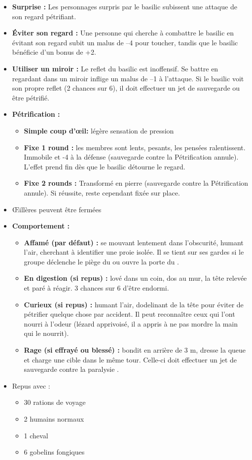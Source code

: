 \begin{itemize}
  \item \textbf{Surprise :} Les personnages surpris par le basilic subissent une attaque de son regard pétrifiant.
  \item \textbf{Éviter son regard :} Une personne qui cherche à combattre le basilic en évitant son regard subit un malus de –4 pour toucher, tandis que le basilic bénéficie d’un bonus de +2.
  \item \textbf{Utiliser un miroir :} Le reflet du basilic est inoffensif. Se battre en regardant dans un miroir inflige un malus de –1 à l’attaque. Si le basilic voit son propre reflet (2 chances sur 6), il doit effectuer un jet de sauvegarde ou être pétrifié.
  \item \textbf{Pétrification :} 
  \begin{itemize}
    \item \textbf{Simple coup d’\oe il:} légère sensation de pression
    \item \textbf{Fixe 1 round :} les membres sont lents, pesants, les pensées ralentissent. 
    Immobile et -4 à la défense (sauvegarde contre la Pétrification annule).
    L’effet prend fin dès que le basilic détourne le regard.
    \item \textbf{Fixe 2 rounds :} Transformé en pierre (sauvegarde contre la Pétrification annule).
    Si réussite, reste cependant fixée sur place.
  \end{itemize}
  \item \OE illères peuvent être fermées
  \item \textbf{Comportement :} 
  \begin{itemize}
    \item \textbf{Affamé (par défaut) :} se mouvant lentement dans l’obscurité, humant l’air, cherchant à identifier une proie isolée. 
    Il se tient sur ses gardes si le groupe déclenche le piège du \textbf{} ou ouvre la porte du \textbf{}.
    \item \textbf{En digestion (si repus) :} lové dans un coin, dos au  mur, la tête relevée et paré à réagir. 
    3 chances sur 6 d’être endormi.
    \item \textbf{Curieux (si repus) :} humant l’air, dodelinant de la tête pour éviter de pétrifier quelque chose par accident.
    Il peut reconnaître ceux qui l’ont nourri à l’odeur (lézard apprivoisé, il a appris  à ne pas mordre la main qui le nourrit).
    \item \textbf{Rage (si effrayé ou blessé) :} bondit en arrière de 3 m, dresse la queue et charge une cible dans le même tour. 
    Celle-ci doit effectuer un jet de sauvegarde contre la paralysie .
  \end{itemize}
  \item Repus avec :
  \begin{itemize}
    \item 30 rations de voyage
    \item 2 humains normaux
    \item 1 cheval
    \item 6 gobelins fongiques
  \end{itemize}
\end{itemize}


